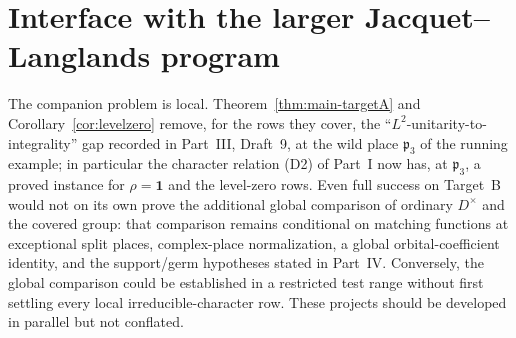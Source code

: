 \documentclass[11pt]{article}
\newcommand{\pfr}{\mathfrak p}
\theoremstyle{plain}
\theoremstyle{definition}
\begin{document}
\section{Interface with the larger Jacquet--Langlands program}
The companion problem is local.  Theorem~\ref{thm:main-targetA} and
Corollary~\ref{cor:levelzero} remove, for the rows they cover, the
``$L^2$-unitarity-to-integrality'' gap recorded in Part~III, Draft~9,
at the wild place $\pfr_3$ of the running example; in particular the
character relation (D2) of Part~I now has, at $\pfr_3$, a proved
instance for $\rho=\mathbf1$ and the level-zero rows.  Even full
success on Target~B would not on its own prove the additional global
comparison of ordinary $D^\times$ and the covered group: that comparison
remains conditional on matching functions at exceptional split places,
complex-place normalization, a global orbital-coefficient identity,
and the support/germ hypotheses stated in Part~IV.  Conversely, the
global comparison could be established in a restricted test range
without first settling every local irreducible-character row.  These
projects should be developed in parallel but not conflated.
\end{document}
